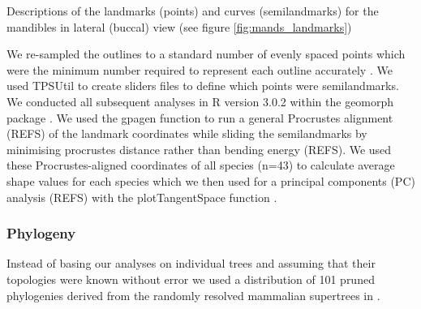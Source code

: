 \documentclass[12pt,a4paper]{article}
\begin{document}

\begin{table}[H]			
\centering
\caption{Descriptions of the landmarks (points) and curves (semilandmarks) for the mandibles in lateral (buccal) view (see figure \ref{fig:mands_landmarks})}

\label{tab:mands_landmarks} %
\end{table}



We re-sampled the outlines to a standard number of evenly spaced points which were the minimum number required to represent each outline accurately \citep[][details in supplementary material]{MacLeod2013}. We used TPSUtil \citep{Rohlf2012} to create sliders files \citep{Zelditch2012} to define which points were semilandmarks. We conducted all subsequent analyses in R version 3.0.2 \citep[R Development Core][]{Team2013} within the geomorph package \citep{Adams2013}. We used the gpagen function to run a general Procrustes alignment (REFS) of the landmark coordinates while sliding the semilandmarks by minimising procrustes distance rather than bending energy (REFS). We used these Procrustes-aligned coordinates of all species (n=43) to calculate average shape values for each species which we then used for a principal components (PC) analysis (REFS) with the plotTangentSpace function \citep{Adams2013}. 

\subsubsection{Phylogeny} 
Instead of basing our analyses on individual trees and assuming that their topologies were known without error 
\citep[e.g.][]{Ruta2013, Foth2012, Brusatte2008, Harmon2003} we used a distribution of 101 pruned phylogenies derived from the randomly resolved mammalian supertrees in \citep{Kuhn2011}. 
\end{document}
